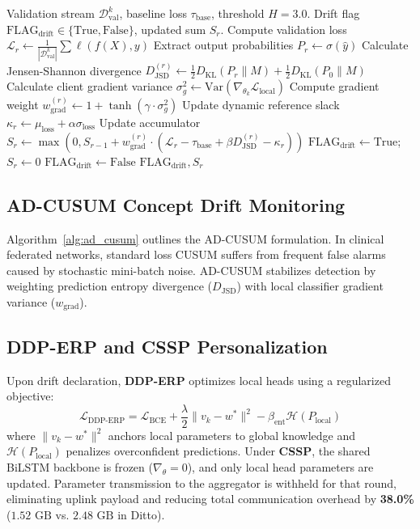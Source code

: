 \documentclass[10pt,a4paper,twocolumn,twoside]{article}
\begin{document}
\begin{algorithm}[t]
\caption{Adaptive Divergence-Weighted Cumulative Sum (AD-CUSUM)}\label{alg:ad_cusum}
\begin{algorithmic}[1]
\REQUIRE Validation stream $\mathcal{D}_{\text{val}}^k$, baseline loss $\tau_{\text{base}}$, threshold $H = 3.0$.
\ENSURE Drift flag $\text{FLAG}_{\text{drift}} \in \{\text{True}, \text{False}\}$, updated sum $S_r$.
\STATE Compute validation loss $\mathcal{L}_r \leftarrow \frac{1}{|\mathcal{D}_{\text{val}}^k|} \sum \ell(f(X), y)$
\STATE Extract output probabilities $P_r \leftarrow \sigma(\hat{y})$
\STATE Calculate Jensen-Shannon divergence $D_{\text{JSD}}^{(r)} \leftarrow \frac{1}{2} D_{\text{KL}}(P_r \parallel M) + \frac{1}{2} D_{\text{KL}}(P_0 \parallel M)$
\STATE Calculate client gradient variance $\sigma_g^2 \leftarrow \text{Var}(\nabla_{\theta_k} \mathcal{L}_{\text{local}})$
\STATE Compute gradient weight $w_{\text{grad}}^{(r)} \leftarrow 1 + \tanh(\gamma \cdot \sigma_g^2)$
\STATE Update dynamic reference slack $\kappa_r \leftarrow \mu_{\text{loss}} + \alpha \sigma_{\text{loss}}$
\STATE Update accumulator $S_r \leftarrow \max\left(0, S_{r-1} + w_{\text{grad}}^{(r)} \cdot (\mathcal{L}_r - \tau_{\text{base}} + \beta D_{\text{JSD}}^{(r)} - \kappa_r)\right)$
    \STATE $\text{FLAG}_{\text{drift}} \leftarrow \text{True}$; $S_r \leftarrow 0$
\ELSE
    \STATE $\text{FLAG}_{\text{drift}} \leftarrow \text{False}$
\ENDIF
\RETURN $\text{FLAG}_{\text{drift}}, S_r$
\end{algorithmic}
\end{algorithm}

\subsection{AD-CUSUM Concept Drift Monitoring}
Algorithm~\ref{alg:ad_cusum} outlines the AD-CUSUM formulation. In clinical federated networks, standard loss CUSUM suffers from frequent false alarms caused by stochastic mini-batch noise. AD-CUSUM stabilizes detection by weighting prediction entropy divergence ($D_{\text{JSD}}$) with local classifier gradient variance ($w_{\text{grad}}$).

\subsection{DDP-ERP and CSSP Personalization}
Upon drift declaration, \textbf{DDP-ERP} optimizes local heads using a regularized objective:
\begin{equation}
\mathcal{L}_{\text{DDP-ERP}} = \mathcal{L}_{\text{BCE}} + \frac{\lambda}{2} \|v_k - w^*\|^2 - \beta_{\text{ent}} \mathcal{H}(P_{\text{local}})
\end{equation}
where $\|v_k - w^*\|^2$ anchors local parameters to global knowledge and $\mathcal{H}(P_{\text{local}})$ penalizes overconfident predictions. Under \textbf{CSSP}, the shared BiLSTM backbone is frozen ($\nabla_\theta = 0$), and only local head parameters are updated. Parameter transmission to the aggregator is withheld for that round, eliminating uplink payload and reducing total communication overhead by \textbf{38.0\%} ($1.52\text{ GB}$ vs. $2.48\text{ GB}$ in Ditto).
\end{document}
